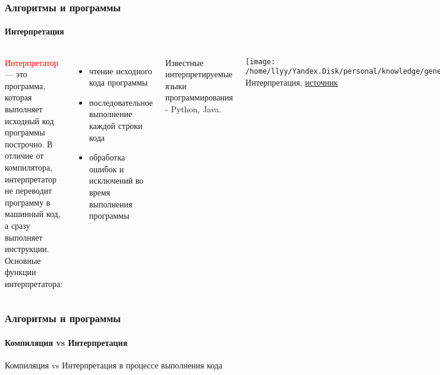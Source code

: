 \documentclass[aspectratio=169]{beamer}
\begin{document}
\begin{frame}
\frametitle{Алгоритмы и программы}
\framesubtitle{Интерпретация}
\begin{block}{}
\begin{columns}[]
\column{\dimexpr\linewidth-40mm}
\justifying
\small
\textcolor{red}{Интерпретатор} — это программа, которая выполняет исходный код программы построчно. В отличие от компилятора, интерпретатор не переводит программу в машинный код, а сразу выполняет инструкции.\newline\newline
Основные функции интерпретатора:
\begin{itemize}
\item{чтение исходного кода программы}
\item{последовательное выполнение каждой строки кода}
\item{обработка ошибок и исключений во время выполнения программы}
\end{itemize}

Известные интерпретируемые языки программирования - Python, Java.

\column{40mm}

\texttt{[image: /home/llyy/Yandex.Disk/personal/knowledge/general/algorithms\_course/repo/algorithms\_course/0\_intro/images/interpreter\_code\_stage]}
\centering
\tiny Интерпретация, \href{https://ya.ru}{источник} 

\end{columns}
\end{block}
\end{frame}

\begin{frame}
\frametitle{Алгоритмы и программы}
\framesubtitle{Компиляция vs Интерпретация}
\justifying
\small
\centering
Компиляция vs Интерпретация в процессе выполнения кода

\begin{figure}
    \captionsetup[subfigure]{labelformat=empty}
    \centering
\end{figure}
\end{frame}
\end{document}
